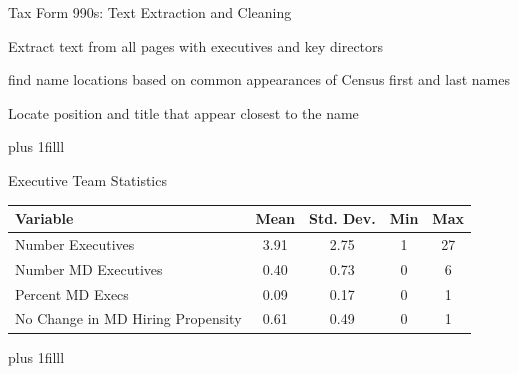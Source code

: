 \documentclass[notes,11pt, aspectratio=169]{beamer}
\newcommand{\btVFill}{\vskip0pt plus 1filll}
\newenvironment{wideitemize}{\itemize\addtolength{\itemsep}{10pt}}{\enditemize}
\begin{document}
\begin{frame}[noframenumbering]{Tax Form 990s: Text Extraction and Cleaning}
\vspace{5mm}
    \begin{wideitemize}
        \item Extract text from all pages with executives and key directors
        \item find name locations based on common appearances of Census first and last names
        \item Locate position and title that appear closest to the name
    \end{wideitemize}

    \btVFill

    \hyperlink{clinexecs}{}
\end{frame}

\begin{frame}[noframenumbering]{Executive Team Statistics}\label{execstats}

\vspace{10mm}
    \begin{table}[ht!]
    \centering
    \begin{tabular}[t]{lcccc}
    \toprule
    Variable & Mean & Std. Dev. & Min & Max\\
    \midrule
    Number Executives & 3.91 & 2.75 & 1 & 27\\
    Number MD Executives & 0.40 & 0.73 & 0 & 6\\
    \hspace{5mm}Percent MD Execs & 0.09 & 0.17 & 0 & 1\\
    No Change in MD Hiring Propensity & 0.61 & 0.49 & 0 & 1\\
    \bottomrule
    \end{tabular}
    \end{table}

    \btVFill

    \hyperlink{clinexecs}{}
\end{frame}
\end{document}
